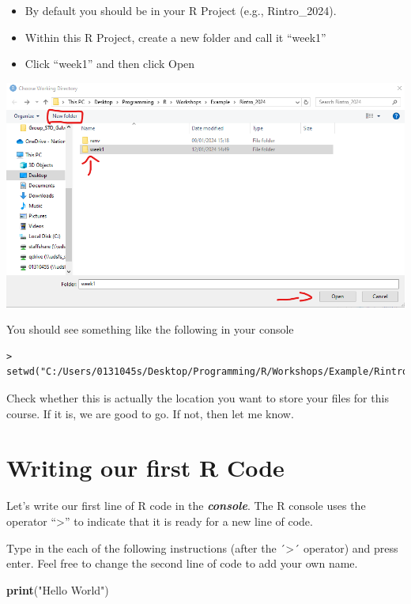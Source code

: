 \documentclass[
]{book}
\newenvironment{Shaded}{\begin{snugshade}}{\end{snugshade}}
\newcommand{\FunctionTok}[1]{\textcolor[rgb]{0.13,0.29,0.53}{\textbf{#1}}}
\newcommand{\NormalTok}[1]{#1}
\newcommand{\StringTok}[1]{\textcolor[rgb]{0.31,0.60,0.02}{#1}}
\begin{document}
\begin{itemize}
\item
  By default you should be in your R Project (e.g., Rintro\_2024).
\item
  Within this R Project, create a new folder and call it ``week1''
\item
  Click ``week1'' and then click Open
\end{itemize}

\includegraphics{img/01-new_wd.png}

You should see something like the following in your console

\begin{verbatim}
> setwd("C:/Users/0131045s/Desktop/Programming/R/Workshops/Example/Rintro_2024/week1")
\end{verbatim}

Check whether this is actually the location you want to store your files for this course. If it is, we are good to go. If not, then let me know.

\hypertarget{writing-our-first-r-code}{%
\section{Writing our first R Code}\label{writing-our-first-r-code}}

Let's write our first line of R code in the \textbf{\emph{console}}. The R console uses the operator ``\textgreater{}'' to indicate that it is ready for a new line of code.

Type in the each of the following instructions (after the ´\textgreater´ operator) and press enter. Feel free to change the second line of code to add your own name.

\begin{Shaded}
\begin{Highlighting}[]
\FunctionTok{print}\NormalTok{(}\StringTok{"Hello World"}\NormalTok{)}
\end{Highlighting}
\end{Shaded}
\end{document}
